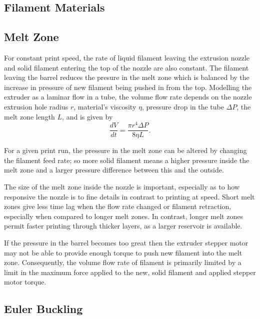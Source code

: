 \subsection{Filament Materials}

\subsection{Melt Zone}

For constant print speed, the rate of liquid filament leaving the extrusion nozzle and solid filament entering the top of the nozzle are also constant. The filament leaving the barrel reduces the presure in the melt zone which is balanced by the increase in pressure of new filament being pushed in from the top. Modelling the extruder as a laminar flow in a tube, the volume flow rate depends on the nozzle extrusion hole radius $r$, material's viscosity $\eta$, pressure drop in the tube $\Delta P$, the melt zone length $L$, and is given by 
\begin{equation}
\frac{dV}{dt} = \frac{\pi r^{4} \Delta P}{8 \eta L}. 
\end{equation}

For a given print run, the pressure in the melt zone can be altered by changing the filament feed rate; so more solid filament means a higher pressure inside the melt zone and a larger pressure difference between this and the outside. 

The size of the melt zone inside the nozzle is important, especially as to how responsive the nozzle is to fine details in contrast to printing at speed. Short melt zones give less time lag when the flow rate changed or filament retraction, especially when compared to longer melt zones. In contrast, longer melt zones permit faster printing through thicker layers, as a larger reservoir is available.  



If the pressure in the barrel becomes too great then the extruder stepper motor may not be able to provide enough torque to push new filament into the melt zone. Consequently, the volume flow rate of filament is primarily limited by a limit in the maximum force applied to the new, solid filament and applied stepper motor torque. 

\subsection{Euler Buckling}


